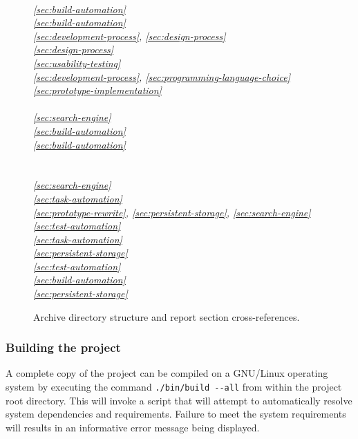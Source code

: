 \begin{figure}[H]
\begin{multicols}{2}
\textit{%
\br{}\\ %
\ref{sec:build-automation}\\ %
\ref{sec:build-automation}\\ %
\ref{sec:development-process}, \ref{sec:design-process}\\ %
\ref{sec:design-process}\\ %
\ref{sec:usability-testing}\\ %
\ref{sec:development-process}, \ref{sec:programming-language-choice}\\ %
\ref{sec:prototype-implementation}\\ %
\br{}\\                                    %
\ref{sec:search-engine}\\ %
\ref{sec:build-automation}\\ %
\ref{sec:build-automation}\\ %
\br{}\\                                    %
\br{}\\                                    %
\ref{sec:search-engine}\\ %
\ref{sec:task-automation}\\ %
\ref{sec:prototype-rewrite}, \ref{sec:persistent-storage}, \ref{sec:search-engine}\\ %
\ref{sec:test-automation}\\ %
\ref{sec:task-automation}\\ %
\ref{sec:persistent-storage}\\ %
\ref{sec:test-automation}\\ %
\ref{sec:build-automation}\\ %
\ref{sec:persistent-storage}\\ %
}
\end{multicols}
\caption[Archive directory structure]
        {Archive directory structure and report section cross-references.}
\label{fig:dir-tree}
\end{figure}

\newpage
\subsubsection*{Building the project}
A complete copy of the project can be compiled on a GNU/Linux
operating system by executing the command \texttt{./bin/build -{}-all}
from within the project root directory. This will invoke a script that
will attempt to automatically resolve system dependencies and
requirements. Failure to meet the system requirements will results in
an informative error message being displayed.


